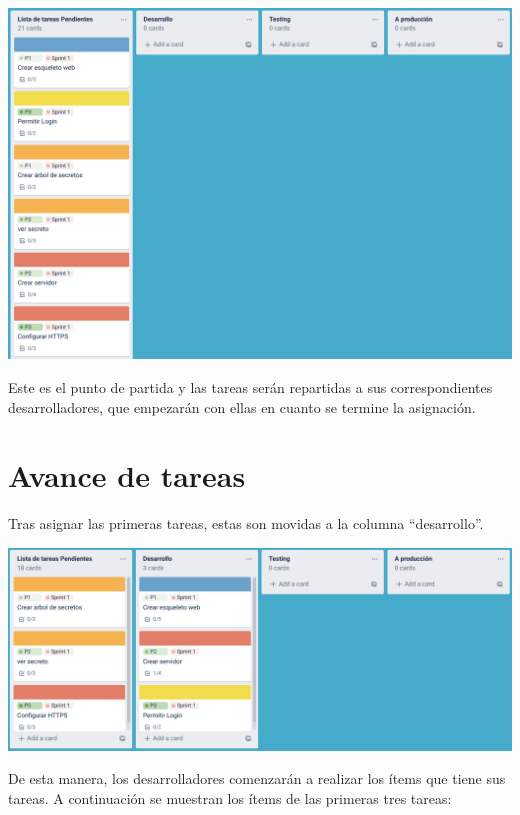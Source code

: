 \documentclass{\ClassPath/viu-tfm-template}
\begin{document}
\begin{center}
    \includegraphics[frame,width=0.9\linewidth]{img/board1.png}
\end{center}

Este es el punto de partida y las tareas serán repartidas a sus correspondientes desarrolladores, que empezarán con ellas en cuanto se termine la asignación.

\section{Avance de tareas}
Tras asignar las primeras tareas, estas son movidas a la columna “desarrollo”.

\begin{center}
    \includegraphics[width=0.9\linewidth]{img/board2.png}
\end{center}

De esta manera, los desarrolladores comenzarán a realizar los ítems que tiene sus tareas. A continuación se muestran los ítems de las primeras tres tareas:
\end{document}
